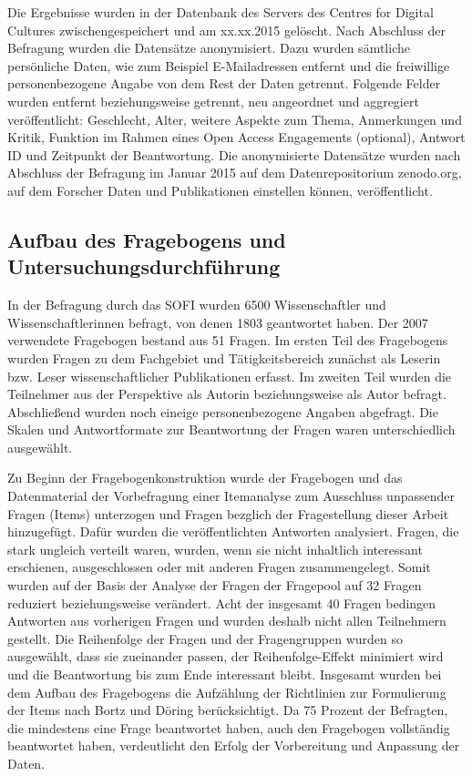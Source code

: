 Die Ergebnisse wurden in der Datenbank des Servers des Centres for Digital Cultures zwischengespeichert und am xx.xx.2015 gelöscht. Nach Abschluss der Befragung wurden die Datensätze anonymisiert. Dazu wurden sämtliche persönliche Daten, wie zum Beispiel E-Mailadressen entfernt und die freiwillige personenbezogene Angabe von dem Rest der Daten getrennt. Folgende Felder wurden entfernt beziehungsweise getrennt, neu angeordnet und aggregiert veröffentlicht: Geschlecht, Alter, weitere Aspekte zum Thema, Anmerkungen und Kritik, Funktion im Rahmen eines Open Access Engagements (optional), Antwort ID und Zeitpunkt der Beantwortung. Die anonymisierte Datensätze wurden nach Abschluss der Befragung im Januar 2015 auf dem Datenrepositorium zenodo.org, auf dem Forscher Daten und Publikationen einstellen können, veröffentlicht.

\subsection{Aufbau des Fragebogens und Untersuchungsdurchführung}

In der Befragung durch das SOFI wurden 6500 Wissenschaftler und Wissenschaftlerinnen befragt, von denen 1803 geantwortet haben. Der 2007 verwendete Fragebogen bestand aus 51 Fragen. Im ersten Teil des Fragebogens wurden Fragen zu dem Fachgebiet und Tätigkeitsbereich zunächst als Leserin bzw. Leser wissenschaftlicher Publikationen erfasst. Im zweiten Teil wurden die Teilnehmer aus der Perspektive als Autorin beziehungsweise als Autor befragt. Abschließend wurden noch eineige personenbezogene Angaben abgefragt. \cite{Hanekop_Wittke_2007_Fragebogen} Die Skalen und Antwortformate zur Beantwortung der Fragen waren unterschiedlich ausgewählt. 

Zu Beginn der Fragebogenkonstruktion wurde der Fragebogen und das Datenmaterial der Vorbefragung einer Itemanalyse zum Ausschluss unpassender Fragen (Items) unterzogen und Fragen bezglich der Fragestellung dieser Arbeit hinzugefügt. Dafür wurden die veröffentlichten Antworten analysiert. Fragen, die stark ungleich verteilt waren, wurden, wenn sie nicht inhaltlich interessant erschienen, ausgeschlossen oder mit anderen Fragen zusammengelegt. Somit wurden auf der Basis der Analyse der Fragen der Fragepool auf 32 Fragen reduziert beziehungsweise verändert. Acht der insgesamt 40 Fragen bedingen Antworten aus vorherigen Fragen und wurden deshalb nicht allen Teilnehmern gestellt. Die Reihenfolge der Fragen und der Fragengruppen wurden so ausgewählt, dass sie zueinander passen, der Reihenfolge-Effekt minimiert wird und die Beantwortung bis zum Ende interessant bleibt. Insgesamt wurden bei dem Aufbau des Fragebogens die Aufzählung der Richtlinien zur Formulierung der Items nach Bortz und Döring \cite{raab_2012_fragebogen} berücksichtigt. Da 75 Prozent der Befragten, die mindestens eine Frage beantwortet haben, auch den Fragebogen vollständig beantwortet haben, verdeutlicht den Erfolg der Vorbereitung und Anpassung der Daten. 

